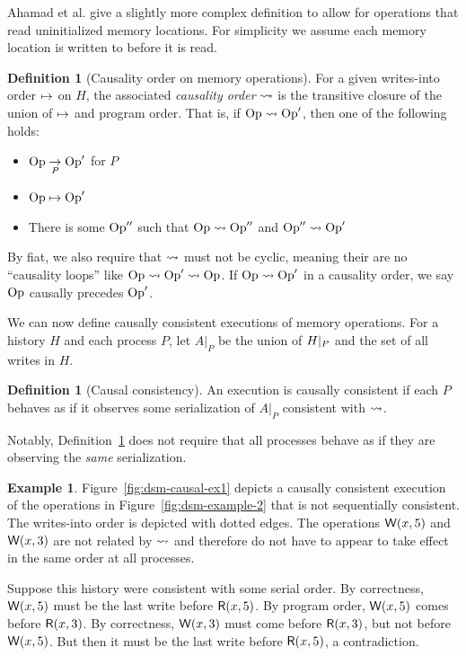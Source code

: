 \documentclass[]             %
{NASA}                       %
\theoremstyle{definition}
\newtheorem{example}[theorem]{Example}
\newtheorem{definition}[theorem]{Definition}
\begin{document}
  Ahamad et al. \cite{1995:causal-memory} give a slightly more complex
  definition to allow for operations that read uninitialized memory
  locations. For simplicity we assume each memory location is written
  to before it is read.

\begin{definition}[Causality order on memory operations]
  \label{def:memorycausalprecedence}
  For a given writes-into order $\mapsto$ on
  $H$, the associated \emph{causality order}
  $\rightsquigarrow$ is the transitive closure of the union of
  $\mapsto$ and program order. That is, if $\mathrm{Op} \rightsquigarrow
  \mathrm{Op}'$, then one of the following holds:
  \begin{itemize}
  \item $\mathrm{Op} \underset{P}{\to} \mathrm{Op}'$ for $P$
  \item $\mathrm{Op} \mapsto \mathrm{Op}'$
  \item There is some $\mathrm{Op}''$ such that $\mathrm{Op} \rightsquigarrow \mathrm{Op}''$ and $\mathrm{Op}'' \rightsquigarrow \mathrm{Op}'$
  \end{itemize}
  By fiat, we also require that $\rightsquigarrow$ must not be cyclic,
  meaning their are no ``causality loops'' like
  $\mathrm{Op} \rightsquigarrow \mathrm{Op}' \rightsquigarrow \mathrm{Op}$.  If
  $\mathrm{Op} \rightsquigarrow \mathrm{Op}'$ in a causality order, we say $\mathrm{Op}$
  causally precedes $\mathrm{Op}'$.
\end{definition}

We can now define causally consistent executions of memory
operations. For a history $H$ and each process $P$, let $A|_{P}$ be
the union of $H|_{P}$ and the set of all writes in $H$.

\begin{definition}[Causal consistency]
  \label{def:causalconsistency}
  An execution is causally consistent if each $P$ behaves as if it
  observes some serialization of $A|_{P}$ consistent with $\rightsquigarrow$.
\end{definition}

Notably, Definition~\ref{def:causalconsistency} does not require that
all processes behave as if they are observing the \emph{same}
serialization.

\begin{example}
  \label{ex:dsm-causal-ex1}
  Figure~\ref{fig:dsm-causal-ex1} depicts a causally consistent
  execution of the operations in Figure~\ref{fig:dsm-example-2} that
  is not sequentially consistent. The writes-into order is depicted
  with dotted edges. The operations $\mathsf{W}\!\left(x, 5\right)$ and
  $\mathsf{W}\!\left(x, 3\right)$ are not related by $\rightsquigarrow$ and therefore
  do not have to appear to take effect in the same order at all processes.

  Suppose this history were consistent with some serial order. By
  correctness, $\mathsf{W}\!\left(x, 5\right)$ must be the last write before
  $\mathsf{R}\!\left(x, 5\right)$. By program order, $\mathsf{W}\!\left(x, 5\right)$ comes
  before $\mathsf{R}\!\left(x, 3\right)$. By correctness, $\mathsf{W}\!\left(x, 3\right)$ must
  come before $\mathsf{R}\!\left(x, 3\right)$, but not before
  $\mathsf{W}\!\left(x, 5\right)$. But then it must be the last write before
  $\mathsf{R}\!\left(x, 5\right)$, a contradiction.
\end{example}
\end{document}

